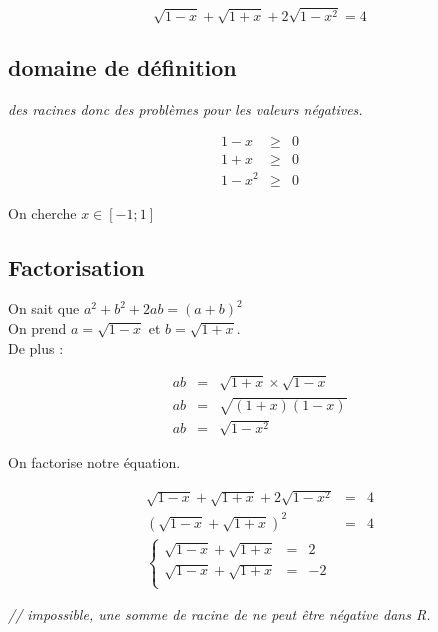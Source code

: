 \documentclass[11pt]{article}
\begin{document}
$$\sqrt{1 - x } + \sqrt{1 + x } + 2\sqrt{1 - x^2 } = 4$$

\setlength{\columnseprule}{1pt}
\begin{multicols}{2}

\subsection*{domaine de définition}

\textit{des racines donc des problèmes pour les valeurs négatives.}

\begin{eqnarray*}
1 - x &\geq& 0 \\
1 + x &\geq& 0 \\
1 - x^2 &\geq& 0
\end{eqnarray*}

On cherche $x \in [-1 ; 1]$

\subsection*{Factorisation}

On sait que $a^2 + b^2 + 2ab = (a+b)^2$ \\

On prend $a = \sqrt{1 - x }$ et $b = \sqrt{1 + x }$.\\

De plus : 

\begin{eqnarray*}
ab &=& \sqrt{1 + x } \times \sqrt{1 - x } \\
ab &=& \sqrt{(1+x)(1-x)} \\
ab &=& \sqrt{1 - x^2}
\end{eqnarray*}

On factorise notre équation.

\begin{eqnarray*}
\sqrt{1 - x } + \sqrt{1 + x } + 2\sqrt{1 - x^2 } &=& 4 \\
(\sqrt{1-x} + \sqrt{1+x})^2 &=& 4 \\
 \left\{
      \begin{aligned}
\sqrt{1-x} + \sqrt{1+x} &=& 2 \\
\sqrt{1-x} + \sqrt{1+x} &=& -2 \\
      \end{aligned}
    \right.
\end{eqnarray*}

\textit{ // impossible, une somme de racine de ne peut être négative dans R.}


\end{multicols}
\end{document}
